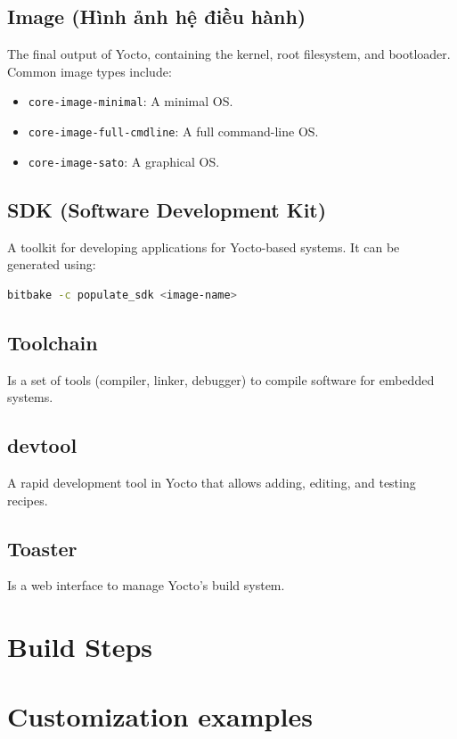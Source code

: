 \documentclass{article}
\begin{document}
\subsection{Image (Hình ảnh hệ điều hành)}
The final output of Yocto, containing the kernel, root filesystem, and bootloader. Common image types include:
\begin{itemize}
    \item \texttt{core-image-minimal}: A minimal OS.
    \item \texttt{core-image-full-cmdline}: A full command-line OS.
    \item \texttt{core-image-sato}: A graphical OS.
\end{itemize}

\subsection{SDK (Software Development Kit)}
A toolkit for developing applications for Yocto-based systems. It can be generated using:
\begin{lstlisting}[language=bash]
bitbake -c populate_sdk <image-name>
\end{lstlisting}

\subsection{Toolchain}
Is a set of tools (compiler, linker, debugger) to compile software for embedded systems.

\subsection{devtool}
A rapid development tool in Yocto that allows adding, editing, and testing recipes.

\subsection{Toaster}
Is a web interface to manage Yocto's build system.

\section{Build Steps} \label{sec:build-steps}

\section{Customization examples} \label{sec:customization-examples}
\end{document}
